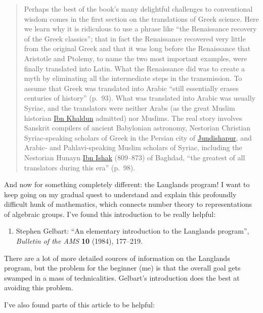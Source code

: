 \documentclass{article}
\def\tightlist{}
\begin{document}
\begin{quote}
Perhaps the best of the book's many delightful challenges to
conventional wisdom comes in the first section on the translations of
Greek science. Here we learn why it is ridiculous to use a phrase like
``the Renaissance recovery of the Greek classics''; that in fact the
Renaissance recovered very little from the original Greek and that it
was long before the Renaissance that Aristotle and Ptolemy, to name the
two most important examples, were finally translated into Latin. What
the Renaissance did was to create a myth by eliminating all the
intermediate steps in the transmission. To assume that Greek was
translated into Arabic ``still essentially erases centuries of history''
(p.~93). What was translated into Arabic was usually Syriac, and the
translators were neither Arabs (as the great Muslim historian
\href{http://en.wikipedia.org/wiki/Ibn_Khaldun}{Ibn Khaldun} admitted)
nor Muslims. The real story involves Sanskrit compilers of ancient
Babylonian astronomy, Nestorian Christian Syriac-speaking scholars of
Greek in the Persian city of
\href{http://en.wikipedia.org/wiki/Jundishapur}{Jundishapur}, and
Arabic- and Pahlavi-speaking Muslim scholars of Syriac, including the
Nestorian Hunayn
\href{http://www.nestorian.org/hunein_ibn_ishak.html}{Ibn Ishak}
(809--873) of Baghdad, ``the greatest of all translators during this
era'' (p.~98).
\end{quote}

And now for something completely different: the Langlands program! I
want to keep going on my gradual quest to understand and explain this
profoundly difficult hunk of mathematics, which connects number theory
to representations of algebraic groups. I've found this introduction to
be really helpful:

\begin{enumerate}
\def\labelenumi{\arabic{enumi})}
\setcounter{enumi}{7}
\tightlist
\item
  Stephen Gelbart: ``An elementary introduction to the Langlands
  program'', \emph{Bulletin of the AMS} \textbf{10} (1984), 177--219.
\end{enumerate}

There are a lot of more detailed sources of information on the Langlands
program, but the problem for the beginner (me) is that the overall goal
gets swamped in a mass of technicalities. Gelbart's introduction does
the best at avoiding this problem.

I've also found parts of this article to be helpful:
\end{document}
